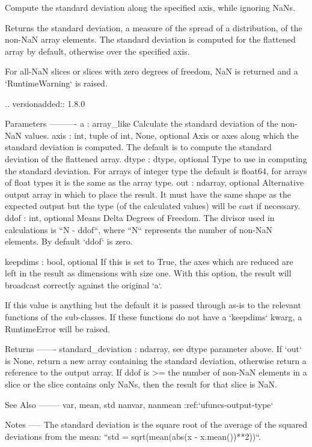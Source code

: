 \begin{DoxyVerb}Compute the standard deviation along the specified axis, while
ignoring NaNs.

Returns the standard deviation, a measure of the spread of a
distribution, of the non-NaN array elements. The standard deviation is
computed for the flattened array by default, otherwise over the
specified axis.

For all-NaN slices or slices with zero degrees of freedom, NaN is
returned and a `RuntimeWarning` is raised.

.. versionadded:: 1.8.0

Parameters
----------
a : array_like
    Calculate the standard deviation of the non-NaN values.
axis : {int, tuple of int, None}, optional
    Axis or axes along which the standard deviation is computed. The default is
    to compute the standard deviation of the flattened array.
dtype : dtype, optional
    Type to use in computing the standard deviation. For arrays of
    integer type the default is float64, for arrays of float types it
    is the same as the array type.
out : ndarray, optional
    Alternative output array in which to place the result. It must have
    the same shape as the expected output but the type (of the
    calculated values) will be cast if necessary.
ddof : int, optional
    Means Delta Degrees of Freedom.  The divisor used in calculations
    is ``N - ddof``, where ``N`` represents the number of non-NaN
    elements.  By default `ddof` is zero.

keepdims : bool, optional
    If this is set to True, the axes which are reduced are left
    in the result as dimensions with size one. With this option,
    the result will broadcast correctly against the original `a`.

    If this value is anything but the default it is passed through
    as-is to the relevant functions of the sub-classes.  If these
    functions do not have a `keepdims` kwarg, a RuntimeError will
    be raised.

Returns
-------
standard_deviation : ndarray, see dtype parameter above.
    If `out` is None, return a new array containing the standard
    deviation, otherwise return a reference to the output array. If
    ddof is >= the number of non-NaN elements in a slice or the slice
    contains only NaNs, then the result for that slice is NaN.

See Also
--------
var, mean, std
nanvar, nanmean
:ref:`ufuncs-output-type`

Notes
-----
The standard deviation is the square root of the average of the squared
deviations from the mean: ``std = sqrt(mean(abs(x - x.mean())**2))``.


\end{DoxyVerb}
